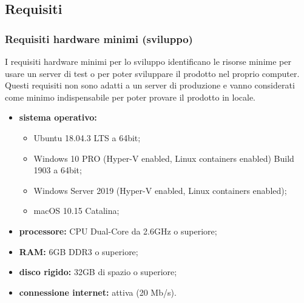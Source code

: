 \subsection{Requisiti}
	\subsubsection{Requisiti hardware minimi (sviluppo)}
	I requisiti hardware minimi per lo sviluppo identificano le risorse minime per usare un server di test o per poter sviluppare il prodotto nel proprio computer. Questi requisiti non sono adatti a un server di produzione e vanno considerati come minimo indispensabile per poter provare il prodotto in locale.
		\begin{itemize}
			\item \textbf{sistema operativo:} 
			\begin{itemize}
				\item Ubuntu 18.04.3 LTS a 64bit;
				\item Windows 10 PRO (Hyper-V enabled, Linux containers enabled) Build 1903 a 64bit; 
				\item Windows Server 2019 (Hyper-V enabled, Linux containers enabled);
				\item macOS 10.15 Catalina;
			\end{itemize}
			\item \textbf{processore:} CPU Dual-Core da 2.6GHz o superiore;
			\item \textbf{RAM:} 6GB DDR3 o superiore;
			\item \textbf{disco rigido:} 32GB di spazio o superiore;
			\item \textbf{connessione internet:} attiva (20 Mb/s).
		\end{itemize}

